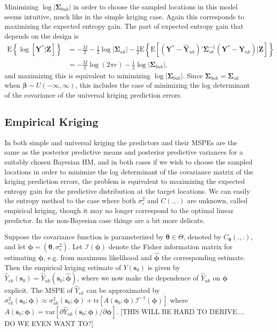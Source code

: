\documentclass[12pt]{article}
\newcommand{\var}{\mathrm{var}}
\newcommand{\E}{\mathrm{E}}
\newcommand{\tr}{\mathrm{tr}}
\begin{document}
Minimizing $\log|\bm{\Sigma}_{buk}|$ in order to choose the sampled locations in this model seems intuitive, much like in the simple kriging case. Again this corresponds to maximizing the expected entropy gain. The part of expected entropy gain that depends on the design is
\begin{align*}
\E\left\{\log[\bm{Y}^*|\bm{Z}]\right\} &= -\frac{M}{2} - \frac{1}{2}\log|\bm{\Sigma}_{uk}| - \frac{1}{2}\E\left\{\E[(\bm{Y}^* - \widehat{\bm{Y}}_{uk})'\bm{\Sigma}_{sk}^{-1}(\bm{Y}^* - \widehat{\bm{Y}}_{uk})|\bm{Z}]\right\}\\
&= -\frac{M}{2}\log(2\pi e) - \frac{1}{2}\log|\bm{\Sigma}_{buk}|,
\end{align*}
and maximizing this is equivalent to minimizing $\log|\bm{\Sigma}_{buk}|$. Since $\bm{\Sigma}_{buk} = \bm{\Sigma}_{uk}$ when $\bm{\beta}\sim U(-\infty,\infty)$, this includes the case of minimizing the log determinant of the covariance of the universal kriging prediction errors.
\subsection{Empirical Kriging}
In both simple and universal kriging the predictors and their MSPEs are the same as the posterior predictive means and posterior predictive variances for a suitably chosen Bayesian HM, and in both cases if we wish to choose the sampled locations in order to minimize the log determinant of the covariance matrix of the kriging prediction errors, the problem is equivalent to maximizing the expected entropy gain for the predictive distribution at the target locations. We can easily the entropy method to the case where both $\sigma^2_{\varepsilon}$ and $C(.,.)$ are unknown, called empirical kriging, though it may no longer correspond to the optimal linear predictor. In the non-Bayesian case things are a bit more delicate.

Suppose the covariance function is parameterized by $\bm{\theta}\in\Theta$, denoted by $C_{\bm{\theta}}(.,.)$, and let $\bm{\phi} = (\bm{\theta}, \sigma^2_{\varepsilon})$. Let $\mathcal{I}(\bm{\phi})$ denote the Fisher information matrix for estimating $\bm{\phi}$, e.g. from maximum likelihood and $\widehat{\bm{\phi}}$ the corresponding estimate. Then the empirical kriging estimate of $Y(\bm{s}_0)$ is given by $\widehat{Y}_{ek}(\bm{s}_0) = \widehat{Y}_{uk}(\bm{s}_0;\widehat{\bm{\phi}})$, where we now make the dependence of $\widehat{Y}_{uk}$ on $\bm{\phi}$ explicit. The MSPE of $\widehat{Y}_{ek}$ can be approximated by $\sigma^2_{ek}(\bm{s}_0;\bm{\phi}) \approx \sigma^2_{uk}(\bm{s}_0;\bm{\phi}) + \tr[A(\bm{s}_0;\bm{\phi})\mathcal{I}^{-1}(\bm{\phi})]$ where $A(\bm{s}_0;\bm{\phi}) = \var[\partial \hat{Y}_{uk}(\bm{s}_0;\bm{\phi})/\partial \bm{\phi}]$. [THIS WILL BE HARD TO DERIVE.... DO WE EVEN WANT TO?]
\end{document}
